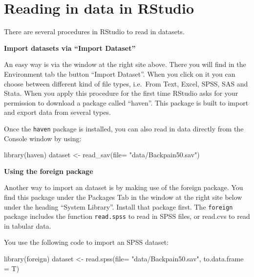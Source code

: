 \documentclass[
]{book}
\newenvironment{Shaded}{\begin{snugshade}}{\end{snugshade}}
\newcommand{\AttributeTok}[1]{\textcolor[rgb]{0.77,0.63,0.00}{#1}}
\newcommand{\FunctionTok}[1]{\textcolor[rgb]{0.00,0.00,0.00}{#1}}
\newcommand{\NormalTok}[1]{#1}
\newcommand{\OtherTok}[1]{\textcolor[rgb]{0.56,0.35,0.01}{#1}}
\newcommand{\StringTok}[1]{\textcolor[rgb]{0.31,0.60,0.02}{#1}}
\begin{document}
\hypertarget{reading-in-data-in-rstudio}{%
\section{Reading in data in RStudio}\label{reading-in-data-in-rstudio}}

There are several procedures in RStudio to read in datasets.

\textbf{Import datasets via ``Import Dataset''}

An easy way is via the window at the right site above. There you will find in the Environment tab the button ``Import Dataset''. When you click on it you can choose between different kind of file types, i.e.~From Text, Excel, SPSS, SAS and Stata. When you apply this procedure for the first time RStudio asks for your permission to download a package called ``haven''. This package is built to import and export data from several types.

Once the \texttt{haven} package is installed, you can also read in data directly from the Console window by using:

\begin{Shaded}
\begin{Highlighting}[]
\FunctionTok{library}\NormalTok{(haven)}
\NormalTok{dataset }\OtherTok{\textless{}{-}} \FunctionTok{read\_sav}\NormalTok{(}\AttributeTok{file=} \StringTok{"data/Backpain50.sav"}\NormalTok{)}
\end{Highlighting}
\end{Shaded}

\textbf{Using the foreign package}

Another way to import an dataset is by making use of the foreign package. You find this package under the Packages Tab in the window at the right site below under the heading ``System Library''. Install that package first. The \texttt{foreign} package includes the function \texttt{read.spss} to read in SPSS files, or read.cvs to read in tabular data.

You use the following code to import an SPSS dataset:

\begin{Shaded}
\begin{Highlighting}[]
\FunctionTok{library}\NormalTok{(foreign)}
\NormalTok{dataset }\OtherTok{\textless{}{-}} \FunctionTok{read.spss}\NormalTok{(}\AttributeTok{file=} \StringTok{"data/Backpain50.sav"}\NormalTok{, }\AttributeTok{to.data.frame =}\NormalTok{ T)}
\end{Highlighting}
\end{Shaded}
\end{document}
